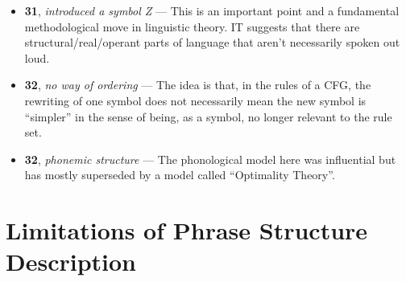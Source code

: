 \documentclass[12pt]{article}
\begin{document}
\begin{itemize}
\item \textbf{31}, \textit{introduced a symbol Z} --- This is an important point and a fundamental methodological move in linguistic theory. IT suggests that there are structural/real/operant parts of language that aren't necessarily spoken out loud.

\item \textbf{32}, \textit{no way of ordering} --- The idea is that, in the rules of a CFG, the rewriting of one symbol does not necessarily mean the new symbol is ``simpler'' in the sense of being, as a symbol, no longer relevant to the rule set.

\item \textbf{32}, \textit{phonemic structure} --- The phonological model here was influential but has mostly superseded by a model called ``Optimality Theory''.

\end{itemize}

\section{Limitations of Phrase Structure Description}
\end{document}
